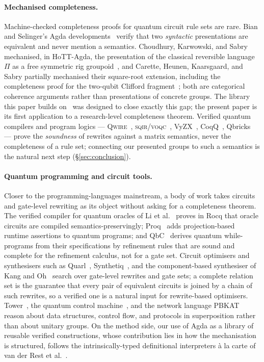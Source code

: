 \paragraph{Mechanised completeness.}
Machine-checked completeness proofs for quantum circuit rule sets are
rare.  Bian and Selinger's Agda
developments~\cite{bian2023cliffordt2,bian2023cliffordcs3} verify that
two \emph{syntactic} presentations are equivalent and never mention a
semantics.  Choudhury, Karwowski, and Sabry mechanised, in HoTT-Agda,
the presentation of the classical reversible language $\Pi$ as a free
symmetric rig groupoid~\cite{choudhury2022symmetries}, and Carette,
Heunen, Kaarsgaard, and Sabry partially mechanised their square-root
extension, including the completeness proof for the two-qubit Clifford
fragment~\cite{carette2024squareroots}; both are categorical coherence
arguments rather than presentations of concrete groups.  The library
this paper builds on~\cite{bian2026framework} was designed to close
exactly this gap; the present paper is its first application to a
research-level completeness theorem.  Verified quantum compilers and
program logics --- \textsc{Qwire}~\cite{paykin2017qwire},
\textsc{sqir}/\textsc{voqc}~\cite{hietala2021voqc},
VyZX~\cite{lehmann2025vyzx}, CoqQ~\cite{zhou2023coqq},
Qbricks~\cite{chareton2021qbricks} --- prove the \emph{soundness} of
rewrites against a matrix semantics, never the completeness of a rule
set; connecting our presented groups to such a semantics is the natural
next step (\S\ref{sec:conclusion}).

\paragraph{Quantum programming and circuit tools.}
Closer to the programming-languages mainstream, a body of work takes
circuits and gate-level rewriting as its object without asking for a
completeness theorem.  The verified compiler for quantum oracles of Li
et al.~\cite{li2022vqo} proves in Rocq that oracle circuits are compiled
semantics-preservingly; Proq~\cite{li2020proq} adds projection-based
runtime assertions to quantum programs; and QbC~\cite{peduri2025qbc}
derives quantum while-programs from their specifications by refinement
rules that are sound and complete for the refinement calculus, not for a
gate set.  Circuit optimisers and synthesisers such as
Quarl~\cite{li2024quarl}, Synthetiq~\cite{paradis2024synthetiq}, and the
component-based synthesiser of Kang and Oh~\cite{kang2023modular} search
over gate-level rewrites and gate sets; a complete relation set is the
guarantee that every pair of equivalent circuits is joined by a chain of
such rewrites, so a verified one is a natural input for rewrite-based
optimisers.  Tower~\cite{yuan2022tower}, the quantum control
machine~\cite{yuan2024qcm}, and the network language
PBKAT~\cite{buckley2025pbkat} reason about data structures, control flow,
and protocols in superposition rather than about unitary groups.  On the
method side, our use of Agda as a library of reusable verified
constructions, whose contribution lies in how the mechanisation is
structured, follows the intrinsically-typed definitional interpreters
\`a la carte of van der Rest et al.~\cite{vanderrest2022alacarte}.

